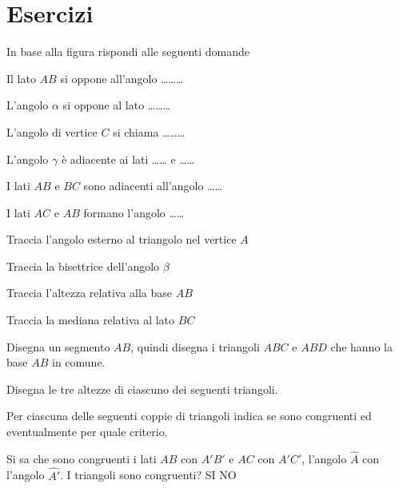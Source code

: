 \section{Esercizi}

\begin{esercizio}
\label{ese:2.1}
In base alla figura rispondi alle seguenti domande 
\begin{enumeratea}
\item Il lato $AB$ si oppone all'angolo \ldots\ldots\ldots
\item L'angolo $\alpha$ si oppone al lato \ldots\ldots\ldots
\item L'angolo di vertice $C$ si chiama \ldots\ldots\ldots
\item L'angolo $\gamma$ è adiacente ai lati \ldots\ldots{} e \ldots\ldots
\item I lati $AB$ e $BC$ sono adiacenti all'angolo \ldots\ldots
\item I lati $AC$ e $AB$ formano l'angolo \ldots\ldots
\item Traccia l'angolo esterno al triangolo nel vertice $A$
\item Traccia la bisettrice dell'angolo $\beta$
\item Traccia l'altezza relativa alla base $AB$
\item Traccia la mediana relativa al lato $BC$
\end{enumeratea}
\end{esercizio}


\begin{esercizio}
\label{ese:2.2}
Disegna un segmento $AB$, quindi disegna i triangoli $ABC$ e $ABD$ che hanno la base $AB$ in comune.
\end{esercizio}

\begin{esercizio}
\label{ese:2.3}
Disegna le tre altezze di ciascuno dei seguenti triangoli.
\end{esercizio}


\begin{esercizio}
\label{ese:2.4}
Per ciascuna delle seguenti coppie di triangoli indica se sono congruenti ed eventualmente per quale criterio.
\end{esercizio}

Si sa che sono congruenti i lati $AB$ con $A'B'$ e $AC$ con $A'C'$, l'angolo $\widehat{A}$ con l'angolo $\widehat{A'}$.
I triangoli sono congruenti? 		SI	NO

